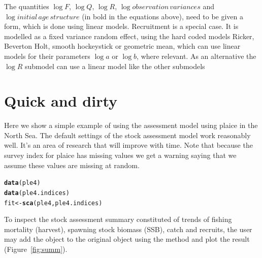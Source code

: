 \documentclass[a4paper,english,10pt]{article}\usepackage[]{graphicx}\usepackage[]{color}
\makeatletter
\newcommand{\hlstd}[1]{\textcolor[rgb]{0.345,0.345,0.345}{#1}}%
\newcommand{\hlkwb}[1]{\textcolor[rgb]{0.69,0.353,0.396}{#1}}%
\newcommand{\hlkwd}[1]{\textcolor[rgb]{0.737,0.353,0.396}{\textbf{#1}}}%
\newenvironment{kframe}{%
 \def\at@end@of@kframe{}%
 \ifinner\ifhmode%
  \def\at@end@of@kframe{\end{minipage}}%
  \begin{minipage}{\columnwidth}%
 \fi\fi%
 \def\FrameCommand##1{\hskip\@totalleftmargin \hskip-\fboxsep
 \colorbox{shadecolor}{##1}\hskip-\fboxsep
     \hskip-\linewidth \hskip-\@totalleftmargin \hskip\columnwidth}%
 \MakeFramed {\advance\hsize-\width
   \@totalleftmargin\z@ \linewidth\hsize
   \@setminipage}}%
 {\par\unskip\endMakeFramed%
 \at@end@of@kframe}
\newenvironment{knitrout}{}{} %
\makeatother
\begin{document}
The quantities $\log{F}$, $\log{Q}$, $\log{R}$, $\log{observation\,variances}$ and $\log{ initial\,age\,structure}$ (in bold in the equations above), need to be given a form, which is done using linear models. Recruitment is a special case. It is modelled as a fixed variance random effect, using the hard coded models Ricker, Beverton Holt, smooth hockeystick or geometric mean, which can use linear models for their parameters $\log{a}$ or $\log{b}$, where relevant. As an alternative the $\log{R}$ submodel can use a linear model like the other submodels 

\section{Quick and dirty}

Here we show a simple example of using the assessment model using plaice in the North Sea. The default settings of the stock assessment model work reasonably well. It's an area of research that will improve with time. Note that because the survey index for plaice has missing values we get a warning saying that we assume these values are missing at random.

\begin{knitrout}
\color{fgcolor}\begin{kframe}
\begin{alltt}
\hlkwd{data}\hlstd{(ple4)}
\hlkwd{data}\hlstd{(ple4.indices)}
\hlstd{fit} \hlkwb{<-} \hlkwd{sca}\hlstd{(ple4, ple4.indices)}
\end{alltt}
\end{kframe}
\end{knitrout}

To inspect the stock assessment summary constituted of trends of fishing mortality (harvest), spawning stock biomass (SSB), catch and recruits, the user may add the  object to the original  object using the \code{+} method and plot the result (Figure~\ref{fig:summ}).
\end{document}
